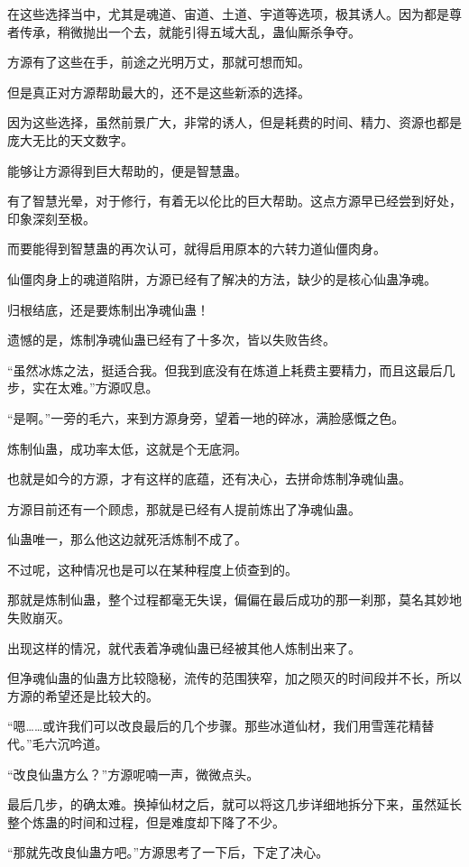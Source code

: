 \begin{this_body}
在这些选择当中，尤其是魂道、宙道、土道、宇道等选项，极其诱人。因为都是尊者传承，稍微抛出一个去，就能引得五域大乱，蛊仙厮杀争夺。

方源有了这些在手，前途之光明万丈，那就可想而知。

但是真正对方源帮助最大的，还不是这些新添的选择。

因为这些选择，虽然前景广大，非常的诱人，但是耗费的时间、精力、资源也都是庞大无比的天文数字。

能够让方源得到巨大帮助的，便是智慧蛊。

有了智慧光晕，对于修行，有着无以伦比的巨大帮助。这点方源早已经尝到好处，印象深刻至极。

而要能得到智慧蛊的再次认可，就得启用原本的六转力道仙僵肉身。

仙僵肉身上的魂道陷阱，方源已经有了解决的方法，缺少的是核心仙蛊净魂。

归根结底，还是要炼制出净魂仙蛊！

遗憾的是，炼制净魂仙蛊已经有了十多次，皆以失败告终。

“虽然冰炼之法，挺适合我。但我到底没有在炼道上耗费主要精力，而且这最后几步，实在太难。”方源叹息。

“是啊。”一旁的毛六，来到方源身旁，望着一地的碎冰，满脸感慨之色。

炼制仙蛊，成功率太低，这就是个无底洞。

也就是如今的方源，才有这样的底蕴，还有决心，去拼命炼制净魂仙蛊。

方源目前还有一个顾虑，那就是已经有人提前炼出了净魂仙蛊。

仙蛊唯一，那么他这边就死活炼制不成了。

不过呢，这种情况也是可以在某种程度上侦查到的。

那就是炼制仙蛊，整个过程都毫无失误，偏偏在最后成功的那一刹那，莫名其妙地失败崩灭。

出现这样的情况，就代表着净魂仙蛊已经被其他人炼制出来了。

但净魂仙蛊的仙蛊方比较隐秘，流传的范围狭窄，加之陨灭的时间段并不长，所以方源的希望还是比较大的。

“嗯……或许我们可以改良最后的几个步骤。那些冰道仙材，我们用雪莲花精替代。”毛六沉吟道。

“改良仙蛊方么？”方源呢喃一声，微微点头。

最后几步，的确太难。换掉仙材之后，就可以将这几步详细地拆分下来，虽然延长整个炼蛊的时间和过程，但是难度却下降了不少。

“那就先改良仙蛊方吧。”方源思考了一下后，下定了决心。


\end{this_body}
